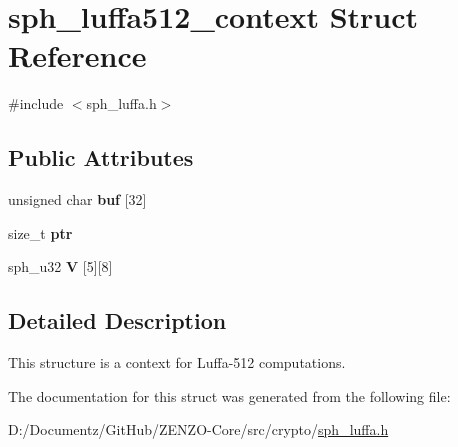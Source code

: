 \hypertarget{structsph__luffa512__context}{}\section{sph\+\_\+luffa512\+\_\+context Struct Reference}
\label{structsph__luffa512__context}


{\ttfamily \#include $<$sph\+\_\+luffa.\+h$>$}

\subsection*{Public Attributes}
\begin{DoxyCompactItemize}
\item 
\mbox{\label{structsph__luffa512__context_a5af7f6fd6cb6e0986911049bff8e4c72}} 
unsigned char {\bfseries buf} \mbox{[}32\mbox{]}
\item 
\mbox{\label{structsph__luffa512__context_a27838c5d89d8247efd7e3fcf9635906b}} 
size\+\_\+t {\bfseries ptr}
\item 
\mbox{\label{structsph__luffa512__context_a458e771cc64352f102a52bb59fc66dc4}} 
sph\+\_\+u32 {\bfseries V} \mbox{[}5\mbox{]}\mbox{[}8\mbox{]}
\end{DoxyCompactItemize}


\subsection{Detailed Description}
This structure is a context for Luffa-\/512 computations. 

The documentation for this struct was generated from the following file\+:\begin{DoxyCompactItemize}
\item 
D\+:/\+Documentz/\+Git\+Hub/\+Z\+E\+N\+Z\+O-\/\+Core/src/crypto/\mbox{\hyperlink{sph__luffa_8h}{sph\+\_\+luffa.\+h}}\end{DoxyCompactItemize}
